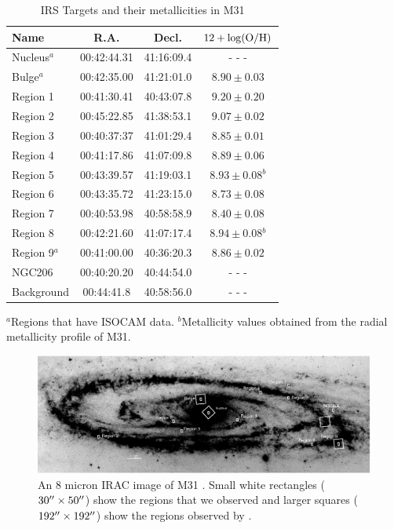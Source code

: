 \begin{table}
 \centering
 \begin{minipage}{70mm}
\caption{IRS Targets and their metallicities in M31
\label{regions}}
  \begin{tabular}{lccc}
  \hline Name & R.A. & Decl. &$12+\log({\rm O/H})$
   \\
 \hline
 Nucleus$^a$&00:42:44.31&41:16:09.4& - - -\\
Bulge$^a$&00:42:35.00&41:21:01.0&$8.90\pm0.03$\\
Region 1&00:41:30.41&40:43:07.8&$9.20\pm0.20$\\
Region 2&00:45:22.85&41:38:53.1&$9.07\pm0.02$\\
Region 3&00:40:37:37&41:01:29.4&$8.85\pm0.01$\\
Region 4&00:41:17.86&41:07:09.8&$8.89\pm0.06$\\
Region 5&00:43:39.57&41:19:03.1&\hspace{0.14cm}$8.93\pm0.08$$^b$\\
Region 6&00:43:35.72&41:23:15.0&$8.73\pm0.08$\\
Region 7&00:40:53.98&40:58:58.9&$8.40\pm0.08$\\
Region 8&00:42:21.60&41:07:17.4&\hspace{0.14cm}$8.94\pm0.08$$^b$\\
Region 9$^a$&00:41:00.00&40:36:20.3&$8.86\pm0.02$\\
NGC206&00:40:20.20&40:44:54.0& - - -\\
Background&00:44:41.8&40:58:56.0& - - -\\
\hline
\end{tabular}
{$^a$Regions that have ISOCAM data. 
$^b$Metallicity values obtained from the radial metallicity profile of M31.}
\end{minipage}
\end{table}

\begin{figure}
\centering
\includegraphics[scale=0.9]{./m31_map.eps}
\caption{An 8 micron IRAC image of M31 \citep{Barmby2006lr}. Small white rectangles ($30\hbox{$^{\prime\prime}$}\times50\hbox{$^{\prime\prime}$}$) show the regions that we observed and larger squares ($192\hbox{$^{\prime\prime}$}\times192\hbox{$^{\prime\prime}$}$) show the regions observed by  \citet{1998Cesarsky}.
\label{m31}
}
\end{figure}

